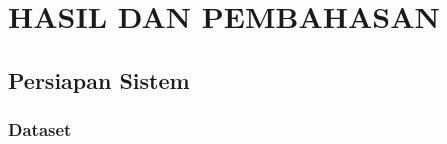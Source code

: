 \fancyhf{} 
\fancyfoot[C]{\thepage}
\chapter{HASIL DAN PEMBAHASAN}

\section{Persiapan Sistem}
\subsection{Dataset}
